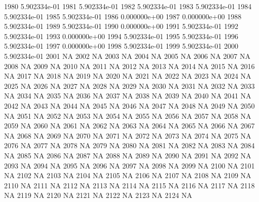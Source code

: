 \documentclass{article}
\begin{document}
\begin{Schunk}
\begin{Soutput}
1980 5.902334e-01
1981 5.902334e-01
1982 5.902334e-01
1983 5.902334e-01
1984 5.902334e-01
1985 5.902334e-01
1986 0.000000e+00
1987 0.000000e+00
1988 5.902334e-01
1989 5.902334e-01
1990 0.000000e+00
1991 5.902334e-01
1992 5.902334e-01
1993 0.000000e+00
1994 5.902334e-01
1995 5.902334e-01
1996 5.902334e-01
1997 0.000000e+00
1998 5.902334e-01
1999 5.902334e-01
2000 5.902334e-01
2001           NA
2002           NA
2003           NA
2004           NA
2005           NA
2006           NA
2007           NA
2008           NA
2009           NA
2010           NA
2011           NA
2012           NA
2013           NA
2014           NA
2015           NA
2016           NA
2017           NA
2018           NA
2019           NA
2020           NA
2021           NA
2022           NA
2023           NA
2024           NA
2025           NA
2026           NA
2027           NA
2028           NA
2029           NA
2030           NA
2031           NA
2032           NA
2033           NA
2034           NA
2035           NA
2036           NA
2037           NA
2038           NA
2039           NA
2040           NA
2041           NA
2042           NA
2043           NA
2044           NA
2045           NA
2046           NA
2047           NA
2048           NA
2049           NA
2050           NA
2051           NA
2052           NA
2053           NA
2054           NA
2055           NA
2056           NA
2057           NA
2058           NA
2059           NA
2060           NA
2061           NA
2062           NA
2063           NA
2064           NA
2065           NA
2066           NA
2067           NA
2068           NA
2069           NA
2070           NA
2071           NA
2072           NA
2073           NA
2074           NA
2075           NA
2076           NA
2077           NA
2078           NA
2079           NA
2080           NA
2081           NA
2082           NA
2083           NA
2084           NA
2085           NA
2086           NA
2087           NA
2088           NA
2089           NA
2090           NA
2091           NA
2092           NA
2093           NA
2094           NA
2095           NA
2096           NA
2097           NA
2098           NA
2099           NA
2100           NA
2101           NA
2102           NA
2103           NA
2104           NA
2105           NA
2106           NA
2107           NA
2108           NA
2109           NA
2110           NA
2111           NA
2112           NA
2113           NA
2114           NA
2115           NA
2116           NA
2117           NA
2118           NA
2119           NA
2120           NA
2121           NA
2122           NA
2123           NA
2124           NA

\end{Soutput}
\end{Schunk}
\end{document}
